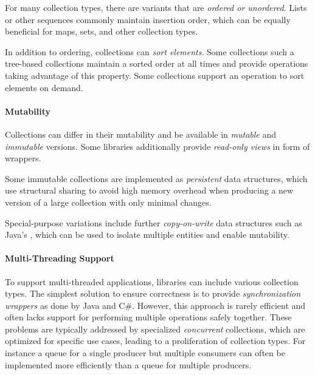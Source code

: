 \documentclass[sigconf, 10pt]{acmart}
\begin{document}
For many collection types,
there are variants that are \emph{ordered or unordered}.
Lists or other sequences commonly maintain insertion order,
which can be equally beneficial for maps, sets, and other collection types.

In addition to ordering, collections can \emph{sort elements}.
Some collections  such a tree-based collections maintain a sorted order at all times and
provide operations taking advantage of this property.
Some collections support an operation to sort elements on demand.

\paragraph{Mutability}


Collections can differ in their mutability
and be available in \emph{mutable} and \emph{immutable} versions.
Some libraries additionally provide \emph{read-only views} in form of wrappers.

Some immutable collections are implemented as \emph{persistent} data structures,
which use structural sharing to avoid high memory overhead when producing
a new version of a large collection with only minimal changes.

Special-purpose variations include further
\emph{copy-on-write} data structures
such as Java's ,
which can be used to isolate multiple entities
and enable mutability.


\paragraph{Multi-Threading Support}


To support multi-threaded applications, 
libraries can include various collection types.
The simplest solution to ensure correctness is
to provide \emph{synchronization wrappers} as done by Java and C\#.
However, this approach is rarely efficient
and often lacks support for performing multiple operations safely together.
These problems are typically addressed
by specialized \emph{concurrent} collections,
which are optimized for specific use cases,
leading to a proliferation of collection types.
For instance a queue for a single producer but multiple consumers
can often be implemented
more efficiently than a queue for multiple producers.
\end{document}

